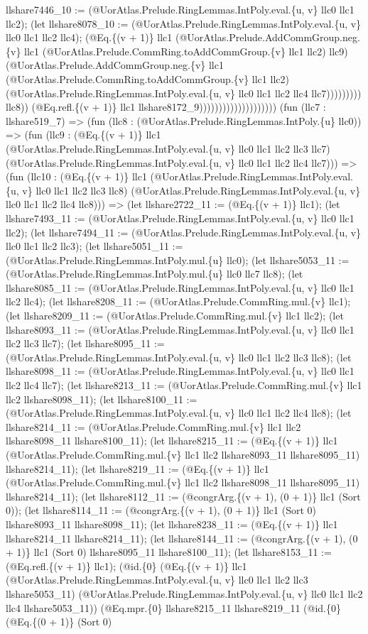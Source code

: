 \documentclass[11pt]{article}
\begin{document}
llshare7446\_10 := (@UorAtlas.Prelude.RingLemmas.IntPoly.eval.\{u, v\} llc0 llc1 llc2); (let llshare8078\_10 := (@UorAtlas.Prelude.RingLemmas.IntPoly.eval.\{u, v\} llc0 llc1 llc2 llc4); (@Eq.\{(v + 1)\} llc1 (@UorAtlas.Prelude.AddCommGroup.neg.\{v\} llc1 (@UorAtlas.Prelude.CommRing.toAddCommGroup.\{v\} llc1 llc2) llc9) (@UorAtlas.Prelude.AddCommGroup.neg.\{v\} llc1 (@UorAtlas.Prelude.CommRing.toAddCommGroup.\{v\} llc1 llc2) (@UorAtlas.Prelude.RingLemmas.IntPoly.eval.\{u, v\} llc0 llc1 llc2 llc4 llc7))))))))) llc8)) (@Eq.refl.\{(v + 1)\} llc1 llshare8172\_9)))))))))))))))))))) (fun (llc7 : llshare519\_7) => (fun (llc8 : (@UorAtlas.Prelude.RingLemmas.IntPoly.\{u\} llc0)) => (fun (llc9 : (@Eq.\{(v + 1)\} llc1 (@UorAtlas.Prelude.RingLemmas.IntPoly.eval.\{u, v\} llc0 llc1 llc2 llc3 llc7) (@UorAtlas.Prelude.RingLemmas.IntPoly.eval.\{u, v\} llc0 llc1 llc2 llc4 llc7))) => (fun (llc10 : (@Eq.\{(v + 1)\} llc1 (@UorAtlas.Prelude.RingLemmas.IntPoly.eval.\{u, v\} llc0 llc1 llc2 llc3 llc8) (@UorAtlas.Prelude.RingLemmas.IntPoly.eval.\{u, v\} llc0 llc1 llc2 llc4 llc8))) => (let llshare2722\_11 := (@Eq.\{(v + 1)\} llc1); (let llshare7493\_11 := (@UorAtlas.Prelude.RingLemmas.IntPoly.eval.\{u, v\} llc0 llc1 llc2); (let llshare7494\_11 := (@UorAtlas.Prelude.RingLemmas.IntPoly.eval.\{u, v\} llc0 llc1 llc2 llc3); (let llshare5051\_11 := (@UorAtlas.Prelude.RingLemmas.IntPoly.mul.\{u\} llc0); (let llshare5053\_11 := (@UorAtlas.Prelude.RingLemmas.IntPoly.mul.\{u\} llc0 llc7 llc8); (let llshare8085\_11 := (@UorAtlas.Prelude.RingLemmas.IntPoly.eval.\{u, v\} llc0 llc1 llc2 llc4); (let llshare8208\_11 := (@UorAtlas.Prelude.CommRing.mul.\{v\} llc1); (let llshare8209\_11 := (@UorAtlas.Prelude.CommRing.mul.\{v\} llc1 llc2); (let llshare8093\_11 := (@UorAtlas.Prelude.RingLemmas.IntPoly.eval.\{u, v\} llc0 llc1 llc2 llc3 llc7); (let llshare8095\_11 := (@UorAtlas.Prelude.RingLemmas.IntPoly.eval.\{u, v\} llc0 llc1 llc2 llc3 llc8); (let llshare8098\_11 := (@UorAtlas.Prelude.RingLemmas.IntPoly.eval.\{u, v\} llc0 llc1 llc2 llc4 llc7); (let llshare8213\_11 := (@UorAtlas.Prelude.CommRing.mul.\{v\} llc1 llc2 llshare8098\_11); (let llshare8100\_11 := (@UorAtlas.Prelude.RingLemmas.IntPoly.eval.\{u, v\} llc0 llc1 llc2 llc4 llc8); (let llshare8214\_11 := (@UorAtlas.Prelude.CommRing.mul.\{v\} llc1 llc2 llshare8098\_11 llshare8100\_11); (let llshare8215\_11 := (@Eq.\{(v + 1)\} llc1 (@UorAtlas.Prelude.CommRing.mul.\{v\} llc1 llc2 llshare8093\_11 llshare8095\_11) llshare8214\_11); (let llshare8219\_11 := (@Eq.\{(v + 1)\} llc1 (@UorAtlas.Prelude.CommRing.mul.\{v\} llc1 llc2 llshare8098\_11 llshare8095\_11) llshare8214\_11); (let llshare8112\_11 := (@congrArg.\{(v + 1), (0 + 1)\} llc1 (Sort 0)); (let llshare8114\_11 := (@congrArg.\{(v + 1), (0 + 1)\} llc1 (Sort 0) llshare8093\_11 llshare8098\_11); (let llshare8238\_11 := (@Eq.\{(v + 1)\} llc1 llshare8214\_11 llshare8214\_11); (let llshare8144\_11 := (@congrArg.\{(v + 1), (0 + 1)\} llc1 (Sort 0) llshare8095\_11 llshare8100\_11); (let llshare8153\_11 := (@Eq.refl.\{(v + 1)\} llc1); (@id.\{0\} (@Eq.\{(v + 1)\} llc1 (@UorAtlas.Prelude.RingLemmas.IntPoly.eval.\{u, v\} llc0 llc1 llc2 llc3 llshare5053\_11) (@UorAtlas.Prelude.RingLemmas.IntPoly.eval.\{u, v\} llc0 llc1 llc2 llc4 llshare5053\_11)) (@Eq.mpr.\{0\} llshare8215\_11 llshare8219\_11 (@id.\{0\} (@Eq.\{(0 + 1)\} (Sort 0) 
\end{document}
